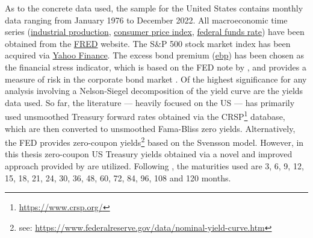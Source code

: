 As to the concrete data used, the sample for the United States contains monthly data ranging from January 1976 to December 2022. 
All macroeconomic time series (\href{https://fred.stlouisfed.org/series/INDPRO}{industrial production}, \href{https://fred.stlouisfed.org/series/CPIAUCSL}{consumer price index}, \href{https://fred.stlouisfed.org/series/DFF}{federal funds rate}) have been obtained from the \href{https://fred.stlouisfed.org/}{FRED} website. 
The S\&P 500 stock market index has been acquired via \href{https://finance.yahoo.com/}{Yahoo Finance}. 
The excess bond premium (\href{https://www.federalreserve.gov/econres/notes/feds-notes/ebp_csv.csv}{ebp}) has been chosen as the financial stress indicator, which is based on the FED note by \citet{favara2016updating}, and provides a measure of risk in the corporate bond market \citep{gilchrist_2012}. 
Of the highest significance for any analysis involving a Nelson-Siegel decomposition of the yield curve are the yields data used. So far, the literature --- heavily focused on the US --- has primarily used unsmoothed \citet{fama1987information} Treasury forward rates obtained via the CRSP\footnote{\url{https://www.crsp.org/}} database, which are then converted to unsmoothed Fama-Bliss zero yields. 
Alternatively, the FED provides zero-coupon yields\footnote{see: \url{https://www.federalreserve.gov/data/nominal-yield-curve.htm}} based on the Svensson model. 
However, in this thesis zero-coupon US Treasury yields obtained via a novel and improved approach provided by \citet{liu2021reconstructing} are utilized. Following \citet{diebold2006macroeconomy}, the maturities used are 3, 6, 9, 12, 15, 18, 21, 24, 30, 36, 48, 60, 72, 84, 96, 108 and 120 months. 


